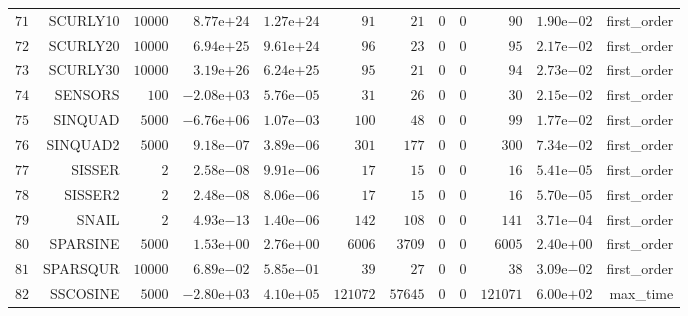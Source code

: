 \begin{longtable}{rrrrrrrrrrrr}
  \(    71\) & SCURLY10 & \( 10000\) & \( 8.77\)e\(+24\) & \( 1.27\)e\(+24\) & \(    91\) & \(    21\) & \(     0\) & \(     0\) & \(    90\) & \( 1.90\)e\(-02\) & first\_order \\
  \(    72\) & SCURLY20 & \( 10000\) & \( 6.94\)e\(+25\) & \( 9.61\)e\(+24\) & \(    96\) & \(    23\) & \(     0\) & \(     0\) & \(    95\) & \( 2.17\)e\(-02\) & first\_order \\
  \(    73\) & SCURLY30 & \( 10000\) & \( 3.19\)e\(+26\) & \( 6.24\)e\(+25\) & \(    95\) & \(    21\) & \(     0\) & \(     0\) & \(    94\) & \( 2.73\)e\(-02\) & first\_order \\
  \(    74\) & SENSORS & \(   100\) & \(-2.08\)e\(+03\) & \( 5.76\)e\(-05\) & \(    31\) & \(    26\) & \(     0\) & \(     0\) & \(    30\) & \( 2.15\)e\(-02\) & first\_order \\
  \(    75\) & SINQUAD & \(  5000\) & \(-6.76\)e\(+06\) & \( 1.07\)e\(-03\) & \(   100\) & \(    48\) & \(     0\) & \(     0\) & \(    99\) & \( 1.77\)e\(-02\) & first\_order \\
  \(    76\) & SINQUAD2 & \(  5000\) & \( 9.18\)e\(-07\) & \( 3.89\)e\(-06\) & \(   301\) & \(   177\) & \(     0\) & \(     0\) & \(   300\) & \( 7.34\)e\(-02\) & first\_order \\
  \(    77\) & SISSER & \(     2\) & \( 2.58\)e\(-08\) & \( 9.91\)e\(-06\) & \(    17\) & \(    15\) & \(     0\) & \(     0\) & \(    16\) & \( 5.41\)e\(-05\) & first\_order \\
  \(    78\) & SISSER2 & \(     2\) & \( 2.48\)e\(-08\) & \( 8.06\)e\(-06\) & \(    17\) & \(    15\) & \(     0\) & \(     0\) & \(    16\) & \( 5.70\)e\(-05\) & first\_order \\
  \(    79\) & SNAIL & \(     2\) & \( 4.93\)e\(-13\) & \( 1.40\)e\(-06\) & \(   142\) & \(   108\) & \(     0\) & \(     0\) & \(   141\) & \( 3.71\)e\(-04\) & first\_order \\
  \(    80\) & SPARSINE & \(  5000\) & \( 1.53\)e\(+00\) & \( 2.76\)e\(+00\) & \(  6006\) & \(  3709\) & \(     0\) & \(     0\) & \(  6005\) & \( 2.40\)e\(+00\) & first\_order \\
  \(    81\) & SPARSQUR & \( 10000\) & \( 6.89\)e\(-02\) & \( 5.85\)e\(-01\) & \(    39\) & \(    27\) & \(     0\) & \(     0\) & \(    38\) & \( 3.09\)e\(-02\) & first\_order \\
  \(    82\) & SSCOSINE & \(  5000\) & \(-2.80\)e\(+03\) & \( 4.10\)e\(+05\) & \(121072\) & \( 57645\) & \(     0\) & \(     0\) & \(121071\) & \( 6.00\)e\(+02\) & max\_time \\

\end{longtable}
